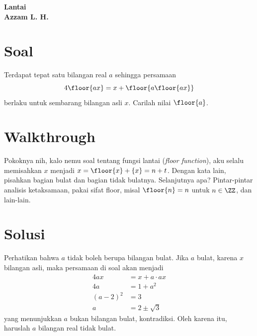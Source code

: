 \begin{center}
    \textbf{\Huge Lantai}\\
    \textbf{\large Azzam L. H.}
\end{center}


\vspace{-1.5cm}
\section{Soal}
Terdapat tepat satu bilangan real $a$ sehingga persamaan
$$4\floor{ax} = x + \floor{a\floor{ax}}$$
berlaku untuk sembarang bilangan asli $x$. Carilah nilai $\floor{a}$.

\newpage
\section{Walkthrough}
Pokoknya nih, kalo nemu soal tentang fungsi lantai (\textit{floor function}), aku selalu memisahkan $x$ menjadi $x= \floor{x} + \{x\} = n + t$. Dengan kata lain, pisahkan bagian bulat dan bagian tidak bulatnya. Selanjutnya apa? Pintar-pintar analisis ketaksamaan, pakai sifat floor, misal $\floor{n}=n$ untuk $n \in \ZZ$, dan lain-lain.

\section{Solusi}
    Perhatikan bahwa $a$ tidak boleh berupa bilangan bulat. Jika $a$ bulat, karena $x$ bilangan asli, maka persamaan di soal akan menjadi
    \begin{align*}
        4ax &= x + a\cdot ax\\
        4a &= 1 + a^2\\
        (a-2)^2 &= 3\\
        a &= 2 \pm \sqrt{3} 
    \end{align*}
    yang menunjukkan $a$ bukan bilangan bulat, kontradiksi. Oleh karena itu, haruslah $a$ bilangan real tidak bulat.
    
